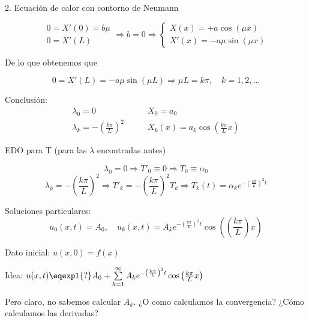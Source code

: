 \begin{example}{2. Ecuación de calor con contorno de Neumann}
\begin{itemize}
			 	\[
			 		\begin{array}{l}
			 		0 = X'(0) = b \mu \\
			 		0 = X'(L)
			 		\end{array} \Rightarrow b = 0 \Rightarrow \left\{ \begin{array}{l}
			 			X(x) = + a \cos (\mu x ) \\
			 			X'(x) = -a \mu \sin (\mu x)
			 		\end{array} \right.
			 	\]

			 	De lo que obtenemos que

			 	\[0 = X'(L) = -a \mu \sin(\mu L) \Rightarrow \mu L = k \pi , \quad k = 1,2,…\]



		\end{itemize}

		Conclusión:
				\begin{align*}
					\lambda_0 = 0\quad & \quad X_0 = a_0 \\
					\lambda_k = - \left(\frac{k\pi}{L}\right)^2\quad & \quad X_k(x) = a_k \cos (\frac{k \pi}{L}x)
				\end{align*}

			 	EDO para T (para las $\lambda$ encontradas antes)

			 	\[\lambda_0 = 0 \Rightarrow T'_0 \equiv 0 \Rightarrow T_0 \equiv \alpha_0\]
			 	\[\lambda_k = - \left(\frac{k\pi}{L}\right)^2 \Rightarrow T'_k = -\left(\frac{k\pi}{L}\right)^2 T_k \Rightarrow T_k (t) = \alpha_k e^{-\left(\frac{k\pi}{L}\right)^2 t} \]

			 	Soluciones particulares:
			 	\[u_0(x,t) = A_0, \quad u_k (x,t) = A_k e^{-\left(\frac{k \pi}{L} \right)^2 t} \cos \left( \left( \frac{k \pi}{L}\right) x \right) \]

			 	Dato inicial: $u(x,0) = f(x)$

			 	Idea: $u(x,t) \eqexpl{?} A_0 + \sum\limits_{k=1}^{\infty} A_k e^{- \left( \frac{k \pi}{L} \right)^2 t}  \cos \left( \frac{k \pi}{L} x \right)$

			 	Pero claro, no sabemos calcular $A_k$. ¿O como calculamos la convergencia? ¿Cómo calculamos las derivadas?


		\end{example}

